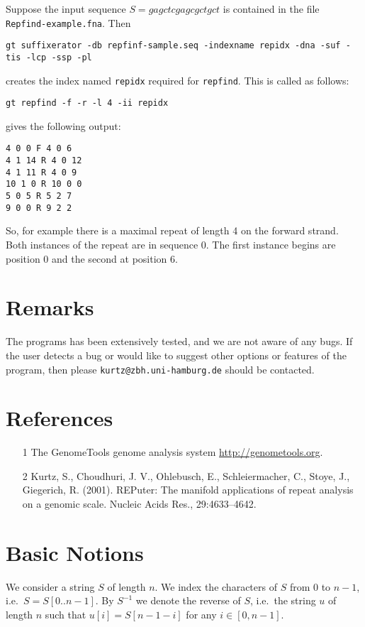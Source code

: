 \documentclass[12pt]{article}
\newcommand{\Repfind}[0]{\texttt{\small repfind}\xspace}
\newcommand{\Substring}[3]{#1[#2..#3]}
\newcommand{\Subchar}[2]{#1[#2]}
\begin{document}
Suppose the input sequence \(S=gagctcgagcgctgct\) 
is contained in the file \texttt{Repfind-example.fna}. Then 
\begin{footnotesize}
\begin{verbatim}
gt suffixerator -db repfinf-sample.seq -indexname repidx -dna -suf -tis -lcp -ssp -pl
\end{verbatim}
\end{footnotesize}
creates the index named \texttt{repidx} required for \Repfind. This is 
called as follows:

\begin{verbatim}
gt repfind -f -r -l 4 -ii repidx
\end{verbatim}
gives the following output:
\begin{verbatim}
4 0 0 F 4 0 6
4 1 14 R 4 0 12
4 1 11 R 4 0 9
10 1 0 R 10 0 0
5 0 5 R 5 2 7
9 0 0 R 9 2 2
\end{verbatim}
So, for example there is a maximal repeat of length 4  on the forward strand.
Both instances of the repeat are in sequence 0. The first instance begins
are position 0 and the second at position 6.

\section{Remarks}
The programs has been extensively tested, and we are not aware of any bugs.
If the user detects a bug or would like to suggest other options or 
features of the program, then please \texttt{kurtz@zbh.uni-hamburg.de}
should be contacted.

\section*{References}
\begin{enumerate}
\item[1]
The GenomeTools genome analysis system \url{http://genometools.org}.
\item[2]
Kurtz, S., Choudhuri, J. V., Ohlebusch, E., Schleiermacher, C., Stoye, J.,
Giegerich, R. (2001). REPuter: The manifold applications of repeat analysis on
a genomic scale. Nucleic Acids Res., 29:4633–4642.
\end{enumerate}

\appendix
\section{Basic Notions}\label{Basic}
We consider a string \(S\) of length \(n\). We index the characters of
\(S\) from \(0\) to \(n-1\), i.e.\ \(S=\Substring{S}{0}{n-1}\). By 
\(S^{-1}\) we denote the reverse of \(S\), i.e.\ the string \(u\) of length 
\(n\) such that \(\Subchar{u}{i}=\Subchar{S}{n-1-i}\) for 
any \(i\in[0,n-1]\).
\end{document}
